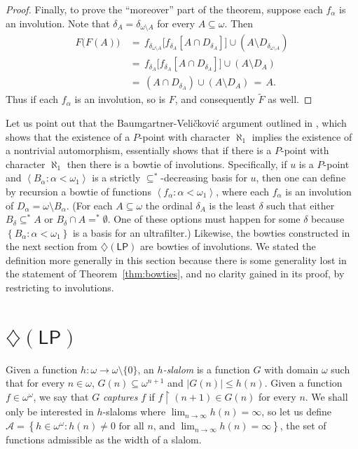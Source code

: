 \documentclass[11pt,leqno]{amsart}
\theoremstyle{definition}
\theoremstyle{remark}
\newcommand{\A}{\mathcal{A}}
\newcommand{\explicitSet}[1]{\left\lbrace #1 \right\rbrace}
\newcommand{\brackets}[1]{\left\langle #1 \right\rangle}
\newcommand{\set}[2]{\explicitSet{#1 \colon #2}}
\newcommand{\seq}[2]{\brackets{#1 \colon #2}}
\newcommand{\<}{\langle}
\renewcommand{\>}{\rangle}
\renewcommand{\a}{\alpha}
\newcommand{\dlt}{\delta}
\newcommand{\w}{\omega}
\newcommand{\0}{\emptyset}
\newcommand{\sub}{\subseteq}
\newcommand{\rest}{\!\restriction\!}
\newcommand{\1}{1\hspace{-1.75mm}1}
\newcommand{\dLP}{\diamondsuit(\mathsf{LP})}
\begin{document}
\begin{proof}
Finally, to prove the ``moreover'' part of the theorem, suppose each $f_\a$ is an involution. Note that $\dlt_A = \dlt_{\w \setminus A}$ for every $A \sub \w$. Then 
\begin{align*}
F\big( F(A) \big) &\,=\, f_{\dlt_{\w \setminus A}}\big[f_{\dlt_A}[A \cap D_{\dlt_A}] \big] \cup ( A \setminus D_{\dlt_{\w \setminus A}} ) \\ 
&\,=\, f_{\dlt_A}\big[f_{\dlt_A}[A \cap D_{\dlt_A}] \big] \cup ( A \setminus D_A ) \\ 
&\,=\, (A \cap D_{\dlt_A}) \cup ( A \setminus D_A ) \,=\, A.
\end{align*}
Thus if each $f_\a$ is an involution, so is $F$, and consequently $\tilde F$ as well. 
\end{proof}

Let us point out that the Baumgartner-Veli\v{c}kovi\'c argument outlined in \cite{Vel}, which shows that the existence of a $P$-point with character $\aleph_1$ implies the existence of a nontrivial automorphism, essentially shows that if there is a $P$-point with character $\aleph_1$ then there is a bowtie of involutions. 
Specifically, if $u$ is a $P$-point and $\seq{B_\a}{\a < \w_1}$ is a strictly $\sub^*$-decreasing basis for $u$, then one can define by recursion a bowtie of functions $\seq{f_\a}{\a < \w_1}$, where each $f_\a$ is an involution of $D_\a = \w \setminus B_\a$. 
(For each $A \sub \w$ the ordinal $\dlt_A$ is the least $\dlt$ such that either $B_\dlt \sub^* A$ or $B_\dlt \cap A =^* \0$. One of these options must happen for some $\dlt$ because $\set{B_\a}{\a < \w_1}$ is a basis for an ultrafilter.) 
Likewise, the bowties constructed in the next section from $\dLP$ are bowties of involutions. 
We stated the definition more generally in this section because there is some generality lost in the statement of Theorem~\ref{thm:bowties}, and no clarity gained in its proof, by restricting to involutions.



\section{$\dLP$}

Given a function $h: \w \to \w \setminus \{0\}$, an \emph{$h$-slalom} 
is a function $G$ with domain $\w$ such that for every $n \in \w$, $G(n) \sub \w^{n+1}$ and $|G(n)| \leq h(n)$. 
Given a function $f \in \w^\w$, we say that $G$ \emph{captures} $f$ if $f \rest (n+1) \in G(n)$ for every $n$. 
We shall only be interested in $h$-slaloms where $\lim_{n \to \infty}h(n) = \infty$, so let us define $\A = \set{h \in \w^\w}{h(n) \neq 0 \text{ for all $n$, and } \lim_{n \to \infty}h(n) = \infty}$, the set of functions admissible as the width of a slalom. 
\end{document}

